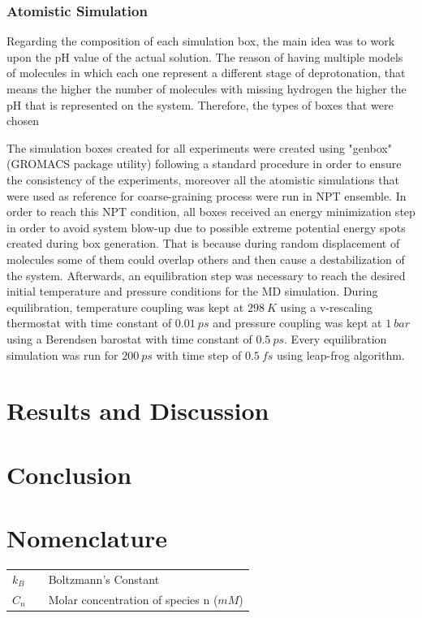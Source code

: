 \documentclass[10pt,a4paper,twoside]{article}
\begin{document}
\subsubsection{Atomistic Simulation}

Regarding the composition of each simulation box, the main idea was to work upon the pH value of the actual solution. The reason of having multiple models of molecules in which each one represent a different stage of deprotonation, that means the higher the number of molecules with missing hydrogen the higher the pH that is represented on the system. Therefore, the types of boxes that were chosen 

The simulation boxes created for all  experiments were created using "genbox" (GROMACS package utility) following a standard procedure in order to ensure the consistency of the experiments, moreover all the atomistic simulations that were used as reference for coarse-graining process were run in NPT ensemble. In order to reach this NPT condition, all boxes received an energy minimization step in order to avoid system blow-up due to possible extreme potential energy spots created during box generation. That is because during random displacement of molecules some of them could overlap others and then cause a destabilization of the system. Afterwards, an equilibration step was necessary to reach the desired initial temperature and pressure conditions for the MD simulation. During equilibration, temperature coupling was kept at $298\ K$ using a v-rescaling thermostat \cite{vtstat} with time constant of $0.01\ ps$ and pressure coupling was kept at $1\ bar$ using a Berendsen barostat \cite{berend} with time constant of $0.5\ ps$.  Every equilibration simulation was run for $200\ ps$ with time step of $0.5\ fs$ using leap-frog algorithm.

%
%
%
%
\section{Results and Discussion}
\section{Conclusion} 
\section{Nomenclature} 
   \begin{tabulary}{1.0\textwidth}{LCL}
   $k_B$ & & Boltzmann's Constant\\
   $C_n$ &   & Molar concentration of species n ($mM$) \\
   \end{tabulary}
\end{document}

